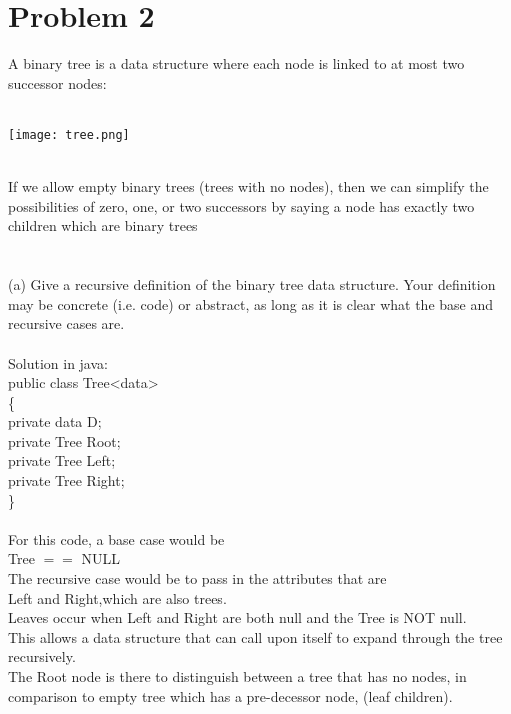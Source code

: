 \documentclass{article}
\newcommand*\moveToRight[1]{\hspace*{0em plus 1fill}\makebox{(#1)}}
\newcommand*\fixindent{ \hspace{1pt}\\}
\begin{document}
\newpage
\section{Problem 2}
A binary tree is a data structure where each node is linked to at most two successor nodes:\\\\
\begin{centering}\texttt{[image: tree.png]}\end{centering}

\fixindent{}
If we allow empty binary trees (trees with no nodes), then we can simplify the possibilities of zero, one, or two successors by saying a node has exactly two children which are binary trees\\\\

\fixindent{}
(a) Give a recursive definition of the binary tree data structure. Your definition may be concrete (i.e. code)
or abstract, as long as it is clear what the base and recursive cases are. \moveToRight{4 marks}\\\\Solution in java:\\
\hspace*{150pt}public class Tree\textless  data\textgreater\\
\hspace*{150pt}\{\\
\hspace*{165pt} private data D;\\
\hspace*{165pt} private Tree Root;\\
\hspace*{165pt} private Tree Left;\\
\hspace*{165pt} private Tree Right;\\
\hspace*{150pt}\}\\\\
For this code, a base case would be \\
Tree $==$ NULL\\
The recursive case would be to pass in the attributes that are\\
Left and Right,which are also trees.\\
Leaves occur when Left and Right are both null and the Tree is NOT null.\\
This allows a data structure that can call upon itself to expand through the tree recursively.\\
The Root node is there to distinguish between a tree that has no nodes, in comparison to empty tree which has a pre-decessor node, (leaf children).\\\\\\
\end{document}
